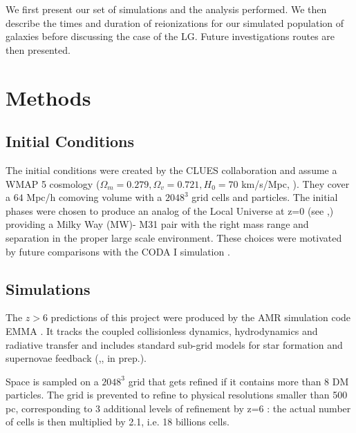 \documentclass[twocolumn]{aastex61}
\begin{document}
We first present our set of simulations and the analysis performed. We then describe the times and duration of reionizations for our simulated population of galaxies before discussing the case of the LG. Future investigations routes are then presented.

\section{Methods}

\subsection{Initial Conditions}
The initial conditions were created by the CLUES collaboration and assume a WMAP 5 cosmology ($\Omega_m=0.279, \Omega_v=0.721, H_0=70$ km/s/Mpc, \citet{HIN9}). They cover a $64$ Mpc/h comoving volume with a $2048^3$ grid cells and particles.  The initial phases were chosen to produce an analog of the Local Universe at z=0 (see \citet{GOT10},\citet{ILI11}) providing a Milky Way (MW)- M31 pair with the right mass range and separation in the proper large scale environment. These choices were motivated by future comparisons with the CODA I simulation \citep{OCV16}.

\subsection{Simulations}
The $z>6$ predictions of this project were produced by the AMR simulation code EMMA \citep{AUB15}. It tracks the coupled collisionless dynamics, hydrodynamics and radiative transfer and includes standard sub-grid models for star formation and supernovae feedback (\citet{RAS06},\citet{DEP17}, in prep.). 

Space is sampled on a $2048^3$  grid that gets refined if it contains more than 8 DM particles. The grid is prevented to refine to physical resolutions smaller than 500 pc, corresponding to 3 additional levels of refinement by z=6 : the actual number of cells is then multiplied by 2.1, i.e. 18 billions cells. 
\end{document}
